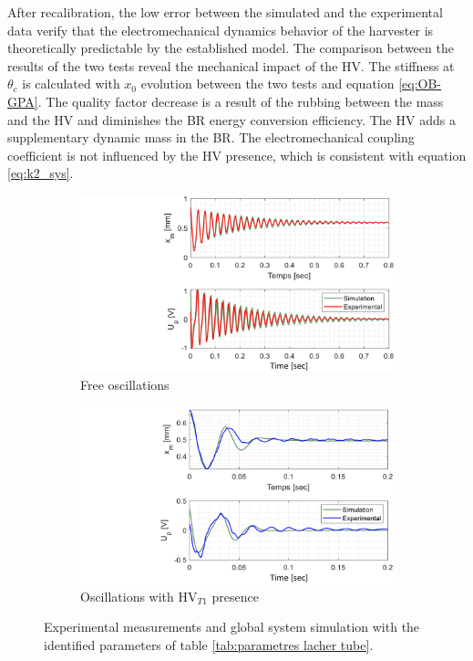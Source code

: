 \documentclass[3p,twocolumn,preprint]{elsarticle}
\begin{document}
After recalibration, the low error between the simulated and the experimental data verify that the electromechanical dynamics behavior of the harvester is theoretically predictable by the established model. 
The comparison between the results of the two tests reveal the mechanical impact of the HV. 
The stiffness at $\theta_c$ is calculated with $x_0$ evolution between the two tests and equation \ref{eq:OB-GPA}. 
The quality factor decrease is a result of the rubbing between the mass and the HV and diminishes the BR energy conversion efficiency.
The HV adds a supplementary dynamic mass in the BR.
The electromechanical coupling coefficient is not influenced by the HV presence, which is consistent with equation \ref{eq:k2_sys}.  
\begin{figure}[!htbp]	
\captionsetup{justification=centering}
	\begin{subfigure}{.49\linewidth}
		\includegraphics[trim={9cm 0cm 0cm 0cm},clip,width=\linewidth]{figures/recalage_free.pdf}
		\caption{Free oscillations}
		\label{fig:recalage_free}
	\end{subfigure}
	\begin{subfigure}{.49\linewidth}
		\includegraphics[trim={8.6cm 0cm 0cm 0cm},clip,width=\linewidth]{figures/recalage_tube.pdf}
		\caption{Oscillations with HV$_{T1}$ presence}
		\label{fig:recalage_tube}
	\end{subfigure}
	\caption{Experimental measurements and global system simulation with the identified parameters of table \ref{tab:parametres lacher tube}.}
	\label{fig:recalage_global}
\end{figure}
\end{document}

